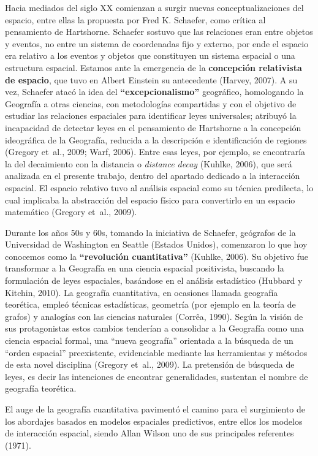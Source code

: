 \documentclass[12pt,spanish,]{article}
\begin{document}
Hacia mediados del siglo XX comienzan a surgir nuevas
conceptualizaciones del espacio, entre ellas la propuesta por Fred K.
Schaefer, como crítica al pensamiento de Hartshorne. Schaefer sostuvo
que las relaciones eran entre objetos y eventos, no entre un sistema de
coordenadas fijo y externo, por ende el espacio era relativo a los
eventos y objetos que constituyen un sistema espacial o una estructura
espacial. Estamos ante la emergencia de la \textbf{concepción
relativista de espacio}, que tuvo en Albert Einstein su antecedente
(Harvey, 2007). A su vez, Schaefer atacó la idea del
\textbf{``excepcionalismo''} geográfico, homologando la Geografía a
otras ciencias, con metodologías compartidas y con el objetivo de
estudiar las relaciones espaciales para identificar leyes universales;
atribuyó la incapacidad de detectar leyes en el pensamiento de
Hartshorne a la concepción ideográfica de la Geografía, reducida a la
descripción e identificación de regiones (Gregory et~al., 2009; Warf,
2006). Entre esas leyes, por ejemplo, se encontraría la del decaimiento
con la distancia o \emph{distance decay} (Kuhlke, 2006), que será
analizada en el presente trabajo, dentro del apartado dedicado a la
interacción espacial. El espacio relativo tuvo al análisis espacial como
su técnica predilecta, lo cual implicaba la abstracción del espacio
físico para convertirlo en un espacio matemático (Gregory et~al., 2009).

Durante los años 50s y 60s, tomando la iniciativa de Schaefer, geógrafos
de la Universidad de Washington en Seattle (Estados Unidos), comenzaron
lo que hoy conocemos como la \textbf{``revolución cuantitativa''}
(Kuhlke, 2006). Su objetivo fue transformar a la Geografía en una
ciencia espacial positivista, buscando la formulación de leyes
espaciales, basándose en el análisis estadístico (Hubbard y Kitchin,
2010). La geografía cuantitativa, en ocasiones llamada geografía
teorética, empleó técnicas estadísticas, geometría (por ejemplo en la
teoría de grafos) y analogías con las ciencias naturales (Corrêa, 1990).
Según la visión de sus protagonistas estos cambios tenderían a
consolidar a la Geografía como una ciencia espacial formal, una ``nueva
geografía'' orientada a la búsqueda de un ``orden espacial''
preexistente, evidenciable mediante las herramientas y métodos de esta
novel disciplina (Gregory et~al., 2009). La pretensión de búsqueda de
leyes, es decir las intenciones de encontrar generalidades, sustentan el
nombre de geografía teorética.

El auge de la geografía cuantitativa pavimentó el camino para el
surgimiento de los abordajes basados en modelos espaciales predictivos,
entre ellos los modelos de interacción espacial, siendo Allan Wilson uno
de sus principales referentes (1971).
\end{document}
